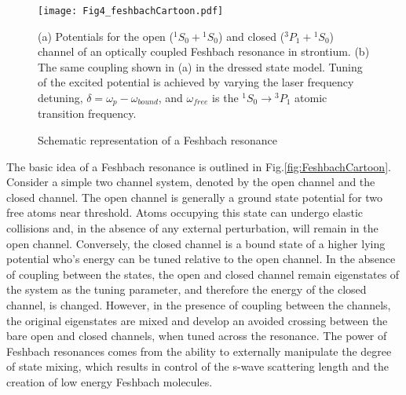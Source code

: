 \begin{figure} \label{fig:ch3_FeshbachCartoon}
	\centerline{
	\texttt{[image: Fig4\_feshbachCartoon.pdf]}}
	\caption{Schematic representation of a Feshbach resonance}{(a) Potentials for the open ($^1S_0\!+\!^1S_0$) and closed ($^3P_1\!+\!^1S_0$) channel of an optically coupled Feshbach resonance in strontium. (b) The same coupling shown in (a) in the dressed state model. Tuning of the excited potential is achieved by varying the laser frequency detuning, $\delta = \omega_p - \omega_{bound}$, and $\omega_{free}$ is the $^1S_0\!\rightarrow\!^3P_1$ atomic transition frequency.}
\end{figure} 
	

The basic idea of a Feshbach resonance is outlined in Fig.\;\ref{fig:FeshbachCartoon}. Consider a simple two channel system, denoted by the open channel and the closed channel. The open channel is generally a ground state potential for two free atoms near threshold. Atoms occupying this state can undergo elastic collisions and, in the absence of any external perturbation, will remain in the open channel. Conversely, the closed channel is a bound state of a higher lying potential who's energy can be tuned relative to the open channel. In the absence of coupling between the states, the open and closed channel remain eigenstates of the system as the tuning parameter, and therefore the energy of the closed channel, is changed. However, in the presence of coupling between the channels, the original eigenstates are mixed and develop an avoided crossing between the bare open and closed channels, when tuned across the resonance. The power of Feshbach resonances comes from the ability to externally manipulate the degree of state mixing, which results in control of the s-wave scattering length and the creation of low energy Feshbach molecules.

